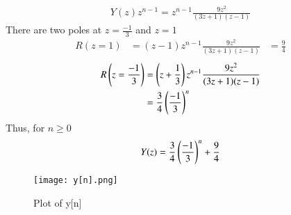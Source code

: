 \documentclass[journal,12pt,twocolumn]{IEEEtran}
\begin{document}
\begin{align}
    Y(z)z^{n-1}=z^{n-1}\frac{9z^2}{(3z+1)(z-1)}
\end{align}
There are two poles at $z=\frac{-1}{3}$ and $z=1$
\begin{align}
    R(z=1)&=(z-1)z^{n-1}\frac{9z^2}{(3z+1)(z-1)}
    &=\frac{9}{4}
\end{align}
\begin{align}
    R\left(z=\frac{-1}{3}\right)&=\left(z+\frac{1}{3}\right)z^{n-1}\frac{9z^2}{(3z+1)(z-1)}\\
    &=\frac{3}{4}\left(\frac{-1}{3}\right)^n
\end{align}
Thus, for $n \geq 0$ \begin{align}
    Y(z)=\frac{3}{4}\left(\frac{-1}{3}\right)^n+\frac{9}{4}
\end{align}
\begin{figure}[!h]
         \centering
         \texttt{[image: y[n].png]}
         \caption{Plot of y[n]}
         \label{plot}
\end{figure}
\end{document}
